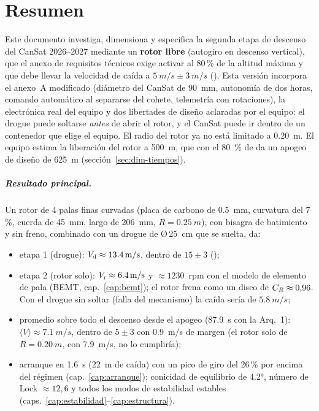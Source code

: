 \chapter*{Resumen}

Este documento investiga, dimensiona y especifica la segunda etapa de descenso del CanSat
2026--2027 mediante un \textbf{rotor libre} (autogiro en descenso vertical), que el anexo
de requisitos técnicos exige activar al 80\,\% de la altitud máxima y que debe llevar la
velocidad de caída a $\SI{5}{m/s}\pm\SI{3}{m/s}$ (). Esta versión incorpora el anexo~A
modificado (diámetro del CanSat de \SI{90}{mm}, autonomía de dos horas, comando automático
al separarse del cohete, telemetría con rotaciones), la electrónica real del equipo y dos
libertades de diseño aclaradas por el equipo: el drogue puede soltarse \emph{antes} de abrir
el rotor, y el CanSat puede ir dentro de un contenedor que elige el equipo. El radio del
rotor ya no está limitado a \SI{0.20}{m}. El equipo estima la liberación del rotor a
\SI{500}{m}, que con el \SI{80}{\percent} de  da un apogeo de diseño de \SI{625}{m}
(sección~\ref{sec:dim-tiempos}).

\paragraph{Resultado principal.} Un rotor de 4 palas finas curvadas (placa de carbono de
\SI{0.5}{mm}, curvatura del 7\,\%, cuerda de \SI{45}{mm}, largo de \SI{206}{mm}, $R=\SI{0.25}{m}$),
con bisagra de batimiento y sin freno, combinado con un drogue de Ø\,\SI{25}{cm} que se
suelta, da:
\begin{itemize}
  \item etapa 1 (drogue): $V_{\mathrm{d}}\approx\SI{13.4}{m/s}$, dentro de $15\pm3$ ();
  \item etapa 2 (rotor solo): $V_{\mathrm{r}}\approx\SI{6.4}{m/s}$ y $\approx\num{1230}$~rpm con el modelo de
        elemento de pala (BEMT, cap.~\ref{cap:bemt}); el rotor frena como un disco de
        $C_{R}\approx0{,}96$. Con el drogue sin soltar (falla del mecanismo) la caída sería de
        $\SI{5.8}{m/s}$;
  \item promedio sobre todo el descenso desde el apogeo (\SI{87.9}{s} con la Arq.~1):
        $\langle V\rangle\approx\SI{7.1}{m/s}$,
        dentro de $5\pm3$ con \SI{0.9}{m/s} de margen (el rotor solo de $R=\SI{0.20}{m}$,
        con \SI{7.9}{m/s}, no lo cumpliría);
  \item arranque en \SI{1.6}{s} (\SI{22}{m} de caída) con un pico de giro del 26\,\% por
        encima del régimen (cap.~\ref{cap:arranque}); conicidad de equilibrio de \ang{4.2}, número
        de Lock $\approx12{,}6$ y todos los modos de estabilidad estables
        (caps.~\ref{cap:estabilidad}--\ref{cap:estructura}).
\end{itemize}

